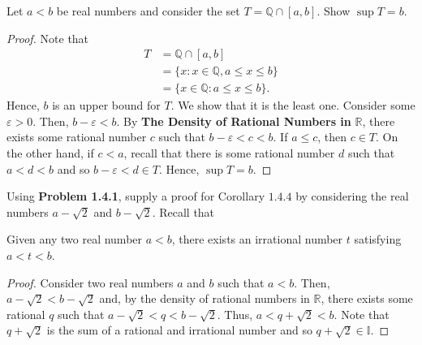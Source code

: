 \documentclass[12pt]{article}
\newcommand{\R}{\mathbb{R}}
\newcommand{\Q}{\mathbb{Q}}
\newenvironment{problem}[2][Problem]{\begin{trivlist}
		\item[\hskip \labelsep {\bfseries #1}\hskip \labelsep {\bfseries #2.}]}{\end{trivlist}}
\newenvironment{corollary}[2][Corollary]{\begin{trivlist}
		\item[\hskip \labelsep {\bfseries #1}\hskip \labelsep {\bfseries #2.}]}{\end{trivlist}}
\begin{document}
	\begin{problem}{1.4.4}
		Let $a<b$ be real numbers and consider the set $T=\Q\cap [a,b]$. Show $\sup T = b$.
		\begin{proof}
			Note that 
			\begin{align*}
				T &= \Q\cap [a,b]\\ 
				&= \{x : x\in \Q, a\leq x \leq b\}\\
				&= \{x\in \Q:a\leq x \leq b\}.
			\end{align*}
		Hence, $b$ is an upper bound for $T$. We show that it is the least one. Consider some $\varepsilon>0$. Then, $b-\varepsilon < b$. By \textbf{The Density of Rational Numbers in }$\R$, there exists some rational number $c$ such that $b-\varepsilon<c<b$. If $a\leq c$, then $c\in T$. On the other hand, if $c<a$, recall that there is some rational number $d$ such that $ a <d <b$ and so $b-\varepsilon < d \in T$. Hence, $\sup T = b$.
		\end{proof}
	\end{problem}

	\begin{problem}{1.4.5}
		Using \textbf{Problem 1.4.1}, supply a proof for Corollary $1.4.4$ by considering the real numbers $a-\sqrt{2}$ and $b-\sqrt{2}$. Recall that
		\begin{corollary}{1.4.4}
			Given any two real number $a<b$, there exists an irrational number $t$ satisfying $a<t<b$.
			\begin{proof}
				Consider two real numbers $a$ and $b$ such that $a<b$. Then, $a-\sqrt{2} < b-\sqrt{2}$ and, by the density of rational numbers in $\R$, there exists some rational $q$ such that $a-\sqrt{2} < q < b-\sqrt{2}$. Thus, $a < q + \sqrt{2} < b$. Note that $q+\sqrt{2}$ is the sum of a rational and irrational number and so $q+\sqrt{2}\in \mathbb{I}$.
			\end{proof}
		\end{corollary}
	\end{problem}
\end{document}
